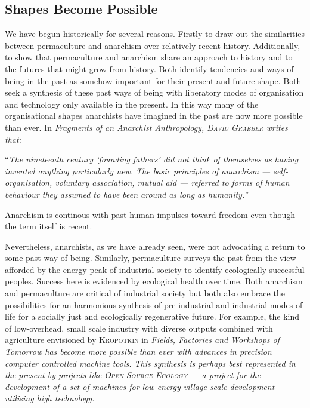 \documentclass[a4paper, 11pt]{article}
\begin{document}
\begin{multicols*}{2}
\section*{Shapes Become Possible}
We have begun historically for several reasons.  Firstly to draw out the similarities between permaculture and anarchism over relatively recent history.  Additionally, to show that permaculture and anarchism share an approach to history and to the futures that might grow from history.  Both identify tendencies and ways of being in the past as somehow important for their present and future shape.  Both seek a synthesis of these past ways of being with liberatory modes of organisation and technology only available in the present.  In this way many of the organisational shapes anarchists have imagined in the past are now more possible than ever.  In \em{Fragments of an Anarchist Anthropology}\em, \textsc{David Graeber} writes that:

\vspace{1mm}
``\em{The nineteenth century `founding fathers' did not think of themselves as having invented anything particularly new.  The basic principles of anarchism --- self-organisation, voluntary association, mutual aid --- referred to forms of human behaviour they assumed to have been around as long as humanity.}\em''
\vspace{1mm}

Anarchism is continous with past human impulses toward freedom even though the term itself is recent.

Nevertheless, anarchists, as we have already seen, were not advocating a return to some past way of being.  Similarly, permaculture surveys the past from the view afforded by the energy peak of industrial society to identify ecologically successful peoples.  Success here is evidenced by ecological health over time.  Both anarchism and permaculture are critical of industrial society but both also embrace the possibilities for an harmonious synthesis of pre-industrial and industrial modes of life for a socially just and ecologically regenerative future.  For example, the kind of low-overhead, small scale industry with diverse outputs combined with agriculture envisioned by \textsc{Kropotkin} in \em{Fields, Factories and Workshops of Tomorrow }\em has become more possible than ever with advances in precision computer controlled machine tools.  This synthesis is perhaps best represented in the present by projects like \textsc{Open Source Ecology} --- a project for the development of a set of machines for low-energy village scale development utilising high technology.


\end{multicols*}
\end{document}
